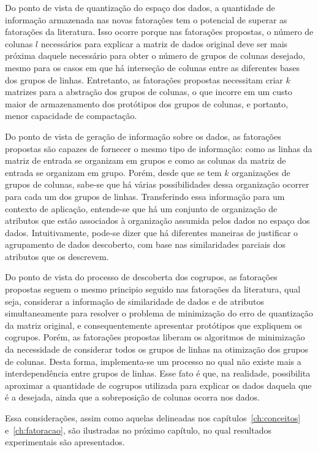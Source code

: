\documentclass[
    12pt,                %
    oneside,            %
    a4paper,            %
    english,            %
    brazil                %
    ]{abntex2ppgsi}
\begin{document}
Do ponto de vista de quantização do espaço dos dados, a quantidade de informação armazenada nas novas fatorações tem o potencial de superar as fatorações da literatura.
Isso ocorre porque nas fatorações propostas, o número de colunas $l$ necessários para explicar a matriz de dados original deve ser mais próxima daquele necessário para obter o número de grupos de colunas desejado, mesmo para os casos em que há interseção de colunas entre as diferentes bases dos grupos de linhas.
Entretanto, as fatorações propostas necessitam criar $k$ matrizes para a abstração dos grupos de colunas, o que incorre em um custo maior de armazenamento dos protótipos dos grupos de colunas, e portanto, menor capacidade de compactação.

Do ponto de vista de geração de informação sobre os dados, as fatorações propostas são capazes de fornecer o mesmo tipo de informação: como as linhas da matriz de entrada se organizam em grupos e como as colunas da matriz de entrada se organizam em grupo.
Porém, desde que se tem $k$ organizações de grupos de colunas, sabe-se que há várias possibilidades dessa organização ocorrer para cada um dos grupos de linhas.
Transferindo essa informação para um contexto de aplicação, entende-se que há um conjunto de organização de atributos que estão associados à organização assumida pelos dados no espaço dos dados.
Intuitivamente, pode-se dizer que há diferentes maneiras de justificar o agrupamento de dados descoberto, com base nas similaridades parciais dos atributos que os descrevem.

Do ponto de vista do processo de descoberta dos cogrupos, as fatorações propostas seguem o mesmo principio seguido nas fatorações da literatura, qual seja, considerar a informação de similaridade de dados e de atributos simultaneamente para resolver o problema de minimização do erro de quantização da matriz original, e consequentemente apresentar protótipos que expliquem os cogrupos.
Porém, as fatorações propostas liberam os algoritmos de minimização da necessidade de considerar todos os grupos de linhas na otimização dos grupos de colunas.
Desta forma, implementa-se um processo no qual não existe mais a interdependência entre grupos de linhas.
Esse fato é que, na realidade, possibilita aproximar a quantidade de cogrupos utilizada para explicar os dados daquela que é a desejada, ainda que a sobreposição de colunas ocorra nos dados.

Essa considerações, assim como aquelas delineadas nos capítulos~\ref{ch:conceitos} e~\ref{ch:fatoracao}, são ilustradas no próximo capítulo, no qual resultados experimentais são apresentados.
\end{document}
